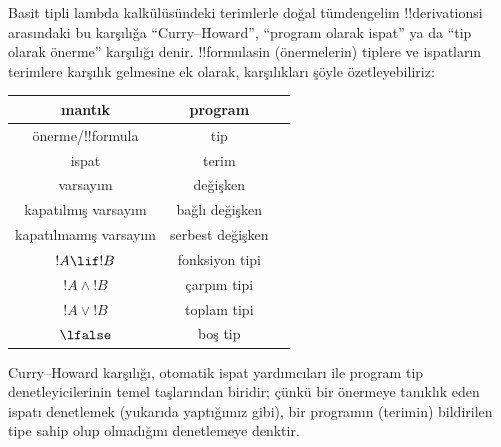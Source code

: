 Basit tipli lambda kalkülüsündeki terimlerle doğal tümdengelim
!!{derivation}s{}i arasındaki bu karşılığa ``Curry--Howard'', ``program olarak
ispat'' ya da ``tip olarak önerme'' karşılığı denir. !!{formula}s{}in
(önermelerin) tiplere ve ispatların terimlere karşılık gelmesine ek olarak,
karşılıkları şöyle özetleyebiliriz:
\begin{center}
  \begin{tabular}{c c c}
    mantık & program \\
    \hline
    önerme/!!{formula} & tip \\
    ispat & terim \\
    varsayım & değişken \\
    kapatılmış varsayım & bağlı değişken \\
    kapatılmamış varsayım & serbest değişken \\
    $!A \lif !B$ & fonksiyon tipi \\
    $!A \land !B$ & çarpım tipi \\
    $!A \lor !B$ & toplam tipi \\
    $\lfalse$ & boş tip \\
    \hline
  \end{tabular}
\end{center}

Curry--Howard karşılığı, otomatik ispat yardımcıları ile program tip
denetleyicilerinin temel taşlarından biridir; çünkü bir önermeye tanıklık
eden ispatı denetlemek (yukarıda yaptığımız gibi), bir programın (terimin)
bildirilen tipe sahip olup olmadığını denetlemeye denktir.
